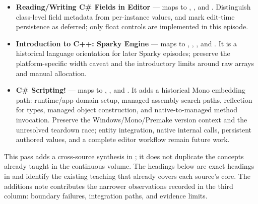 \begin{itemize}
\item
  \textbf{Reading/Writing C\# Fields in Editor} --- maps to , , and . Distinguish class-level field metadata from per-instance values, and mark edit-time persistence as deferred; only float controls are implemented in this episode.
\item
  \textbf{Introduction to C++: Sparky Engine} --- maps to , , , and . It is a historical language orientation for later Sparky episodes; preserve the platform-specific width caveat and the introductory limits around raw arrays and manual allocation.
\item
  \textbf{C\# Scripting!} --- maps to , , and . It adds a historical Mono embedding path: runtime/app-domain setup, managed assembly search paths, reflection for types, managed object construction, and native-to-managed method invocation. Preserve the Windows/Mono/Premake version context and the unresolved teardown race; entity integration, native internal calls, persistent authored values, and a complete editor workflow remain future work.
\end{itemize}

This pass adds a cross-source synthesis in ; it does not duplicate the concepts already taught in the continuous volume. The headings below are exact headings in  and identify the existing teaching that already covers each source's core. The additions note contributes the narrower observations recorded in the third column: boundary failures, integration paths, and evidence limits.

